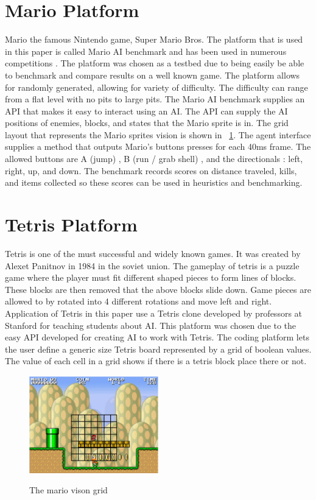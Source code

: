 \documentclass[12pt]{ucthesis} \newif\ifpdf \ifx\pdfoutput\undefined
\begin{document}
\section{Mario Platform}
Mario the famous Nintendo game, Super Mario Bros.  The platform
that is used in this paper is called Mario AI benchmark and has been used in
numerous competitions \cite{karakovskiy2012mario}. The platform was chosen as a
testbed due to being easily be able to benchmark and compare results on a well
known game. The platform allows for randomly generated, allowing for variety of
difficulty. The difficulty can range from a flat level with no pits to large
pits. The Mario AI benchmark supplies an API that makes it easy to interact
using an AI. The API can supply the AI positions of enemies, blocks, and states
that the Mario sprite is in. The grid layout that represents the Mario sprites
vision is shown in ~\ref{fig:mariogrid}. The agent interface supplies a method
that outputs Mario’s buttons presses for each 40ms frame. The allowed buttons
are A (jump) , B (run / grab shell) , and the directionals : left, right, up,
and down. The benchmark records scores on distance traveled, kills, and items
collected so these scores can be used in heuristics and benchmarking.

\section{Tetris Platform}

Tetris is one of the must successful and widely known games. It was created by
Alexet Panitnov in 1984 in the soviet union. The gameplay of tetris is a puzzle
game where the player must fit different shaped pieces to form lines of blocks.
These blocks are then removed that the above blocks slide down. Game pieces are
allowed to by rotated into 4 different rotations and move left and right.
Application of Tetris in this paper use a Tetris clone developed by professors
at Stanford for teaching students about AI. This platform was chosen due to the
easy API developed for creating AI to work with Tetris. The coding platform lets
the user define a generic size Tetris board represented by a grid of boolean
values. The value of each cell in a grid shows if there is a tetris block place
there or not.

\begin{figure}[h!] 
\caption{The mario vison grid}
  \centering
    \includegraphics[width=0.5\textwidth]{mariogrid.png}
   \label{fig:mariogrid} 
\end{figure}
\end{document}
